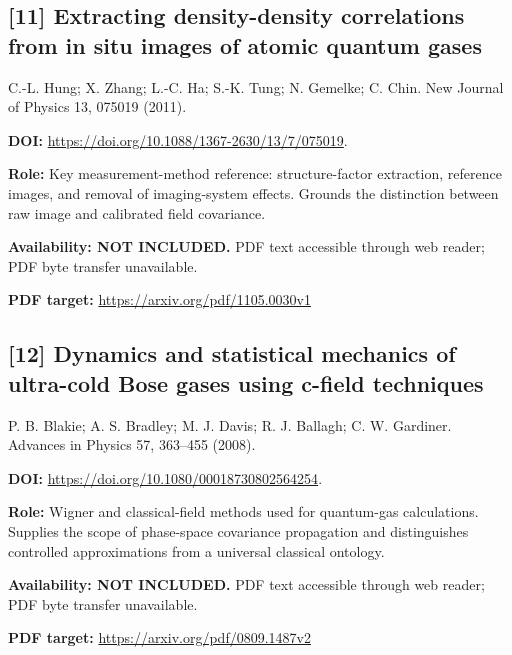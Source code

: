 \documentclass[11pt,a4paper]{article}
\begin{document}
\begin{minipage}{\textwidth}
\subsection*{[11] Extracting density-density correlations from in situ images of atomic quantum gases}
C.-L. Hung; X. Zhang; L.-C. Ha; S.-K. Tung; N. Gemelke; C. Chin. New Journal of Physics 13, 075019 (2011).

\textbf{DOI:} \url{https://doi.org/10.1088/1367-2630/13/7/075019}.

\textbf{Role:} Key measurement-method reference: structure-factor extraction, reference images, and removal of imaging-system effects. Grounds the distinction between raw image and calibrated field covariance.

\textbf{Availability: NOT INCLUDED.} PDF text accessible through web reader; PDF byte transfer unavailable.\par
\textbf{PDF target:} \url{https://arxiv.org/pdf/1105.0030v1}
\end{minipage}
\par\medskip
\begin{minipage}{\textwidth}
\subsection*{[12] Dynamics and statistical mechanics of ultra-cold Bose gases using c-field techniques}
P. B. Blakie; A. S. Bradley; M. J. Davis; R. J. Ballagh; C. W. Gardiner. Advances in Physics 57, 363--455 (2008).

\textbf{DOI:} \url{https://doi.org/10.1080/00018730802564254}.

\textbf{Role:} Wigner and classical-field methods used for quantum-gas calculations. Supplies the scope of phase-space covariance propagation and distinguishes controlled approximations from a universal classical ontology.

\textbf{Availability: NOT INCLUDED.} PDF text accessible through web reader; PDF byte transfer unavailable.\par
\textbf{PDF target:} \url{https://arxiv.org/pdf/0809.1487v2}
\end{minipage}
\par\medskip
\end{document}
